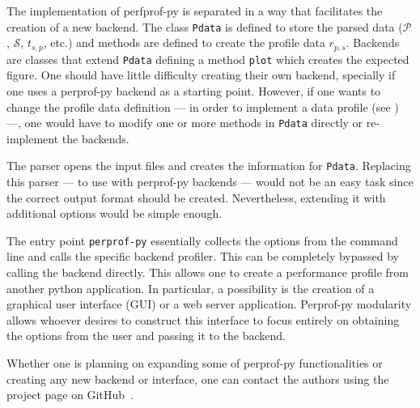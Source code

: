 The implementation of perfprof-py is separated in a way that facilitates the creation of a
new backend.
The class {\tt Pdata} is defined to store the parsed data ($\mathcal{P}$,
$\mathcal{S}$, $t_{s,p}$, etc.) and  methods are defined to create the profile data
$r_{p,s}$.
Backends are classes that extend {\tt Pdata} defining a method {\tt plot}
which creates the expected figure.
One should have little difficulty creating their own backend, specially if one
uses a perprof-py backend as a starting point.
However, if one wants to change the profile data definition --- in order
to implement a data profile (see \cite{bib:more2009benchmarking}) ---, one would have to modify one or more methods in {\tt Pdata} directly or re-implement the backends.

The parser opens the input files and creates the information for {\tt Pdata}.
Replacing this parser --- to use with perprof-py backends --- would not be an easy task
since the correct output format should be created.  Nevertheless,
extending it with additional options would be simple enough.

The entry point {\tt perprof-py} essentially collects the options from the command
line and calls the specific backend profiler. This can be completely bypassed
by calling the backend directly. This allows one to create a performance
profile from another python application. In particular, a possibility is the
creation of a graphical user interface (GUI)
or a web server application. Perprof-py modularity 
allows whoever desires to construct this interface to focus entirely on
obtaining the options from the user and passing it to the backend.

Whether one is planning on expanding some of perprof-py functionalities or creating any
new backend or interface, one can contact the authors using the project page on
GitHub~\cite{url:perprof-py}.

